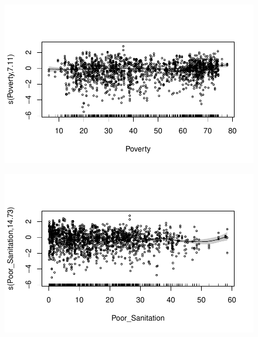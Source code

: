\documentclass[
  letterpaper,
  DIV=11,
  numbers=noendperiod]{scrartcl}
\begin{document}
\begin{figure}[H]

{\centering \includegraphics{Group34Coursework_files/figure-pdf/unnamed-chunk-17-5.pdf}

}

\end{figure}

\begin{figure}[H]

{\centering \includegraphics{Group34Coursework_files/figure-pdf/unnamed-chunk-17-6.pdf}

}

\end{figure}
\end{document}
